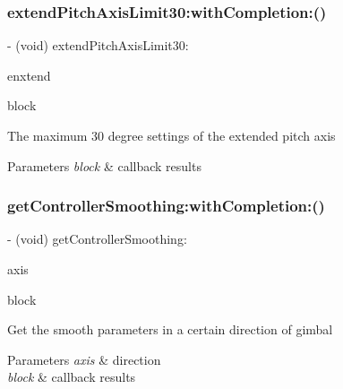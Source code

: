 \subsubsection{\texorpdfstring{extend\+Pitch\+Axis\+Limit30\+:with\+Completion\+:()}{extendPitchAxisLimit30:withCompletion:()}}
{\footnotesize\ttfamily -\/ (void) extend\+Pitch\+Axis\+Limit30\+: \begin{DoxyParamCaption}\item[{(B\+O\+OL)}]{enxtend }\item[{withCompletion:(P\+V\+Completion\+Block)}]{block }\end{DoxyParamCaption}}

The maximum 30 degree settings of the extended pitch axis


\begin{DoxyParams}{Parameters}
{\em block} & callback results \\
\hline
\end{DoxyParams}
\mbox{\label{interface_p_v_gimabal_ab18eed4f5255289a86d46777a37f95f1}} 
\subsubsection{\texorpdfstring{get\+Controller\+Smoothing\+:with\+Completion\+:()}{getControllerSmoothing:withCompletion:()}}
{\footnotesize\ttfamily -\/ (void) get\+Controller\+Smoothing\+: \begin{DoxyParamCaption}\item[{(P\+V\+Gimbal\+Axis)}]{axis }\item[{withCompletion:(void($^\wedge$)(N\+S\+Integer smoothing, N\+S\+Error $\ast$\hyperlink{group___p_v_s_d_k___c_o_r_e___a_p_i___m_o_u_n_t_c_o_n_t_r_o_l_ga5a1de33b230662127568783314b4a54d}{\+\_\+\+Nullable} error))}]{block }\end{DoxyParamCaption}}

Get the smooth parameters in a certain direction of gimbal


\begin{DoxyParams}{Parameters}
{\em axis} & direction \\
\hline
{\em block} & callback results \\
\hline
\end{DoxyParams}
\mbox{\label{interface_p_v_gimabal_aa2a594744332480f17f85aec2a22f4bf}} 
